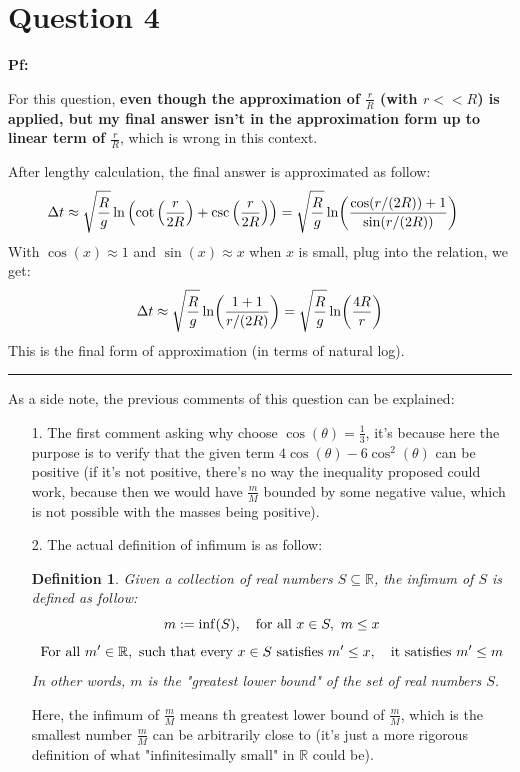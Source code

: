 \documentclass{article}
\newtheorem{define}{Definition}
\newcommand{\RR}{\mathbb{R}}
\DeclarePairedDelimiter{\paran}{(}{)}%
\begin{document}
\break

\section*{Question 4}

\textbf{Pf:}

For this question, \textbf{even though the approximation of $\frac{r}{R}$ (with $r<<R$) is applied, but my final answer isn't in the approximation form up to linear term of $\frac{r}{R}$}, which is wrong in this context.

After lengthy calculation, the final answer is approximated as follow:
\begin{align}
    \Delta t&\approx \sqrt{\frac{R}{g}}\ln\left(\cot\left(\frac{r}{2R}\right)+\csc\left(\frac{r}{2R}\right)\right) = \sqrt{\frac{R}{g}}\ln\paran*{\frac{\cos(r/(2R))+1}{\sin(r/(2R))}}
\end{align}
With $\cos(x)\approx 1$ and $\sin(x)\approx x$ when $x$ is small, plug into the relation, we get:
\begin{align}
    \Delta t\approx \sqrt{\frac{R}{g}}\ln\paran*{\frac{1+1}{r/(2R)}} = \sqrt{\frac{R}{g}}\ln\paran*{\frac{4R}{r}}
\end{align}
This is the final form of approximation (in terms of natural log).

\hfil

\rule{15.6 cm}{0.1mm}

\hfil

As a side note, the previous comments of this question can be explained:

\begin{itemize}
    \item[1.] The first comment asking why choose $\cos(\theta)=\frac{1}{3}$, it's because here the purpose is to verify that the given term $4\cos(\theta)-6\cos^2(\theta)$ can be positive (if it's not positive, there's no way the inequality proposed could work, because then we would have $\frac{m}{M}$ bounded by some negative value, which is not possible with the masses being positive).
    \item[2.] The actual definition of infimum is as follow:
    \begin{define}
        Given a collection of real numbers $S\subseteq \RR$, the infimum of $S$ is defined as follow:
        $$m := \inf(S),\quad \textmd{for all }x \in S,\ m\leq x$$
        $$\textmd{For all } m'\in \RR,\ \textmd{such that every }x\in S\textmd{ satisfies }m'\leq x,\quad \textmd{it satisfies }m'\leq m$$
        In other words, $m$ is the "greatest lower bound" of the set of real numbers $S$.
    \end{define}
    Here, the infimum of $\frac{m}{M}$ means th greatest lower bound of $\frac{m}{M}$, which is the smallest number $\frac{m}{M}$ can be arbitrarily close to (it's just a more rigorous definition of what "infinitesimally small" in $\RR$ could be).
\end{itemize}
\end{document}
